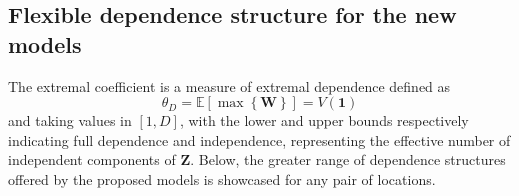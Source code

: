 \documentclass[lineno]{biometrika}
\begin{document}

\subsection{Flexible dependence structure for the new models}

The extremal coefficient is a measure of extremal dependence \citep{Smith:1990b} defined as 
%
\begin{equation*}
\theta_D = \mathbb E \left[ \max \left\{ \bm W \right\}\right]= V( \bm 1)
\end{equation*}
%
and taking values in $[1,D]$, with the lower and upper bounds respectively indicating full dependence and independence, representing the effective number of independent components of $\bm Z$. Below, the greater range of dependence structures offered by the proposed models is showcased for any pair of locations. 
\end{document}
